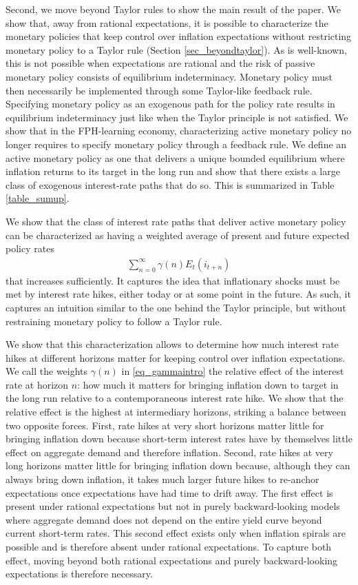 \documentclass{article}
\begin{document}
Second, we move beyond Taylor rules to show the main result of the paper. We show that, away from rational expectations, it is possible to characterize the monetary policies that keep control over inflation expectations without restricting monetary policy to a Taylor rule (Section \ref{sec_beyondtaylor}). As is well-known, this is not possible when expectations are rational and the risk of passive monetary policy consists of equilibrium indeterminacy. Monetary policy must then necessarily be implemented through some Taylor-like feedback rule. Specifying monetary policy as an exogenous path for the policy rate results in equilibrium indeterminacy just like when the Taylor principle is not satisfied. We show that in the FPH-learning economy, characterizing active monetary policy no longer requires to specify monetary policy through a feedback rule. We define an active monetary policy as one that delivers a unique bounded equilibrium where inflation returns to its target in the long run and show that there exists a large class of exogenous interest-rate paths that do so. This is summarized in Table \ref{table_sumup}.

We show that the class of interest rate paths that deliver active monetary policy can be characterized as having a weighted average of present and future expected policy rates
\begin{align}
\sum_{n=0}^{\infty}\gamma(n) E_t(i_{t+n})\label{eq_gammaintro}
\end{align}
that increases sufficiently. It captures the idea that inflationary shocks must be met by interest rate hikes, either today or at some point in the future. As such, it captures an intuition similar to the one behind the Taylor principle, but without restraining monetary policy to follow a Taylor rule.

We show that this characterization allows to determine how much interest rate hikes at different horizons matter for keeping control over inflation expectations. We call the weights $\gamma(n)$ in \eqref{eq_gammaintro} the relative effect of the interest rate at horizon $n$: how much it matters for bringing inflation down to target in the long run relative to a contemporaneous interest rate hike. We show that the relative effect is the highest at intermediary horizons, striking a balance between two opposite forces. First, rate hikes at very short horizons matter little for bringing inflation down because short-term interest rates have by themselves little effect on aggregate demand and therefore inflation. Second, rate hikes at very long horizons matter little for bringing inflation down because, although they can always bring down inflation, it takes much larger future hikes to re-anchor expectations once expectations have had time to drift away. The first effect is present under rational expectations but not in purely backward-looking models where aggregate demand does not depend on the entire yield curve beyond current short-term rates. This second effect exists only when inflation spirals are possible and is therefore absent under rational expectations. To capture both effect, moving beyond both rational expectations and purely backward-looking expectations is therefore necessary.
\end{document}
